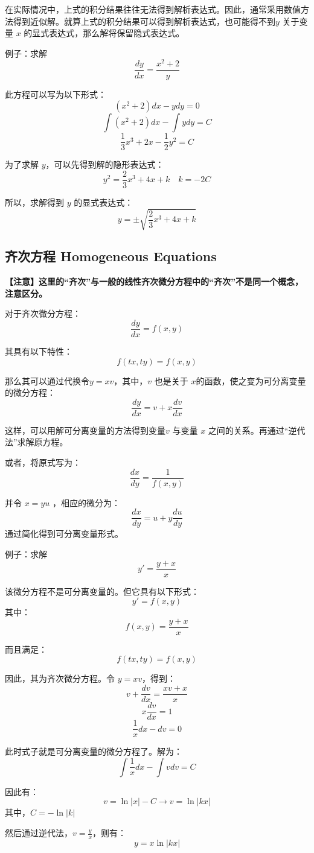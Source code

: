 \documentclass[12pt]{article}
\begin{document}
在实际情况中，上式的积分结果往往无法得到解析表达式。因此，通常采用数值方法得到近似解。就算上式的积分结果可以得到解析表达式，也可能得不到$y$ 关于变量 $x$ 的显式表达式，那么解将保留隐式表达式。

\begin{framed}  
例子：求解
$$
\frac{dy}{dx} = \frac{x^2+2}{y}
$$

此方程可以写为以下形式：
$$
(x^2+2)dx - ydy = 0
$$
$$
\int(x^2+2)dx - \int ydy = C
$$
$$
\frac{1}{3}x^3 + 2x - \frac{1}{2}y^2 = C
$$

为了求解 $y$，可以先得到解的隐形表达式：
$$
y^2 = \frac{2}{3}x^3 + 4x + k \quad k = -2C
$$

所以，求解得到 $y$ 的显式表达式：
$$
y = \pm\sqrt{\frac{2}{3}x^3 + 4x + k}
$$
\end{framed}

\subsection{齐次方程 Homogeneous Equations}
\textbf{【注意】这里的“齐次”与一般的线性齐次微分方程中的“齐次”不是同一个概念，注意区分。}

对于齐次微分方程：
$$
\frac{dy}{dx} = f(x,y)
$$

其具有以下特性：
$$
f(tx,ty) = f(x,y)
$$

那么其可以通过代换令$y = xv$，其中，$v$ 也是关于 $x$的函数，使之变为可分离变量的微分方程：
$$
\frac{dy}{dx} = v + x\frac{dv}{dx}
$$

这样，可以用解可分离变量的方法得到变量$v$ 与变量 $x$ 之间的关系。再通过“逆代法”求解原方程。

或者，将原式写为：
$$
\frac{dx}{dy} = \frac{1}{f(x,y)}
$$

并令 $x = yu$ ，相应的微分为：
$$
\frac{dx}{dy} = u + y\frac{du}{dy}
$$
通过简化得到可分离变量形式。

\begin{framed}  
例子：求解
$$
y' = \frac{y+x}{x}
$$

该微分方程不是可分离变量的。但它具有以下形式：
$$
y' = f(x,y)
$$
其中：
$$
f(x,y) = \frac{y+x}{x}
$$

而且满足：
$$
f(tx,ty) = f(x,y)
$$

因此，其为齐次微分方程。令 $y = xv$，得到：
$$
v + \frac{dv}{dx} = \frac{xv+x}{x}
$$
$$
x\frac{dv}{dx} = 1
$$
$$
\frac{1}{x}dx - dv = 0
$$

此时式子就是可分离变量的微分方程了。解为：
$$
\int\frac{1}{x}dx - \int vdv = C
$$

因此有：
$$
v = \ln|x| - C \rightarrow v = \ln|kx|
$$
其中，$C = -\ln|k|$

然后通过逆代法，$v = \frac{y}{x}$，则有：
$$
y = x\ln|kx|
$$
\end{framed}
\end{document}
